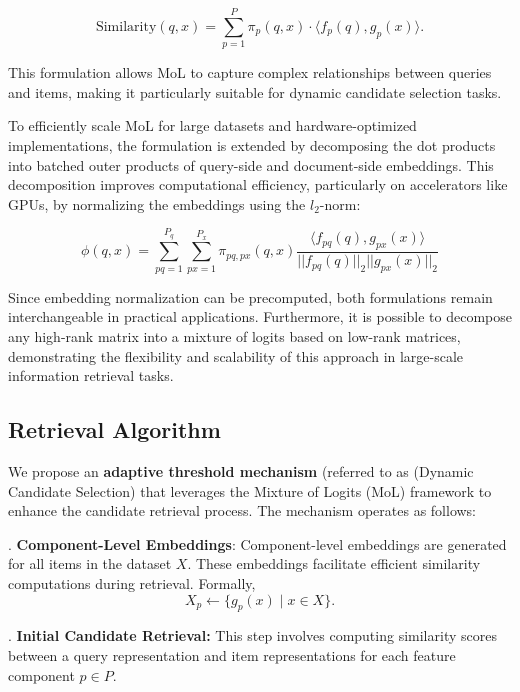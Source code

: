 \documentclass[review]{jair}
\begin{document}
\begin{equation}
\text{Similarity}(q, x) = \sum_{p=1}^P \pi_p(q, x) \cdot \langle f_p(q), g_p(x) \rangle.
\end{equation}

This formulation allows MoL to capture complex relationships between queries and items, making it particularly suitable for dynamic candidate selection tasks.

To efficiently scale MoL for large datasets and hardware-optimized implementations, the formulation is extended by decomposing the dot products into batched outer products of query-side and document-side embeddings. This decomposition improves computational efficiency, particularly on accelerators like GPUs, by normalizing the embeddings using the \( l_2 \)-norm:\cite{zhai2023revisiting}

\begin{equation}
\phi(q,x) = \sum_{pq=1}^{P_q} \sum_{px=1}^{P_x} \pi_{pq,px}(q,x) \frac{\langle f_{pq}(q), g_{px}(x) \rangle}{|| f_{pq}(q) ||_2 || g_{px}(x) ||_2}
\end{equation}


Since embedding normalization can be precomputed, both formulations remain interchangeable in practical applications. Furthermore, it is possible to decompose any high-rank matrix into a mixture of logits based on low-rank matrices, demonstrating the flexibility and scalability of this approach in large-scale information retrieval tasks. 

\subsection{Retrieval Algorithm}
We propose an \textbf{adaptive threshold mechanism} (referred to as (Dynamic Candidate Selection) that leverages the Mixture of Logits (MoL) framework to enhance the candidate retrieval process. The mechanism operates as follows:

. \textbf{Component-Level Embeddings}:  
Component-level embeddings are generated for all items in the dataset \(X\). These embeddings facilitate efficient similarity computations during retrieval. Formally,
\begin{equation}
X_p \leftarrow \{g_p(x) \mid x \in X\}.
\end{equation}

.\textbf{ Initial Candidate Retrieval:} This step involves computing similarity scores between a query representation and item representations for each feature component $p \in P$.  
\end{document}
